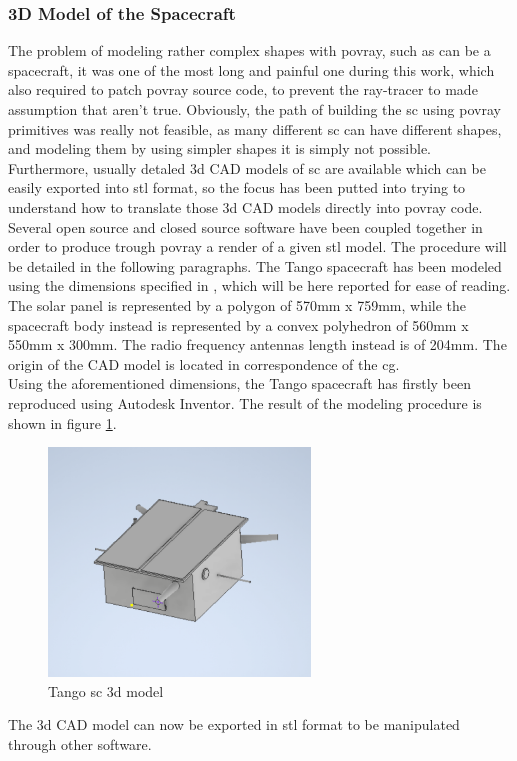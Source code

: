 \subsubsection{3D Model of the Spacecraft}
The problem of modeling rather complex shapes with \acrshort{povray}, such as can be a spacecraft, it was one of the most long and painful one during this work, which also required to patch \acrshort{povray} source code, to prevent the ray-tracer to made assumption that aren't true.
Obviously, the path of building the \acrshort{sc} using \acrshort{povray} primitives was really not feasible, as many different \acrshort{sc} can have different shapes, and modeling them by using simpler shapes it is simply not possible. Furthermore, usually detaled \acrshort{3d} CAD models of \acrshort{sc} are available which can be easily exported into \acrshort{stl} format, so the focus has been putted into trying to understand how to translate those \acrshort{3d} CAD models directly into \acrshort{povray} code.\\
Several open source and closed source software have been coupled together in order to produce trough \acrshort{povray} a render of a given \acrshort{stl} model.
The procedure will be detailed in the following paragraphs.
The Tango spacecraft has been modeled using the dimensions specified in \cite{Sharma2018}, which will be here reported for ease of reading. The solar panel is represented by a polygon of \si{570}{mm} x \si{759}{mm}, while the spacecraft body instead is represented by a convex polyhedron of \si{560}{mm} x \si{550}{mm} x \si{300}{mm}. The radio frequency antennas length instead is of \si{204}{mm}. The origin of the CAD model is located in correspondence of the \acrshort{cg}.\\
Using the aforementioned dimensions, the Tango spacecraft has firstly been reproduced using Autodesk Inventor. The result of the modeling procedure is shown in figure \ref{fig:tango3d}.
\begin{figure}[H]
\centering
\includegraphics[width=0.62\textwidth]{gfx/tangoScreenshot2.eps}
\caption{Tango \acrshort{sc} \acrshort{3d} model}
\label{fig:tango3d}
\end{figure}
The \acrshort{3d} CAD model can now be exported in \acrshort{stl} format to be manipulated through other software.

